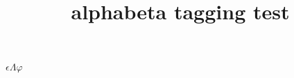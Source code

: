 \documentclass{article}
\title{alphabeta tagging test}
\begin{document}
$\epsilon\Lambda\varphi$

\Alpha\par
\Beta\par
\Gamma\par
\Delta\par
\Epsilon\par
\Zeta\par
\Eta\par
\Theta\par
\Iota\par
\Kappa\par
\Lambda\par
\Mu\par
\Nu\par
\Xi\par
\Omicron\par
\Pi\par
\Rho\par
\Sigma\par
\Tau\par
\Upsilon\par
\Phi\par
\Chi\par
\Psi\par
\Omega\par
\alpha\par
\beta\par
\gamma\par
\delta\par
\epsilon\par
\zeta\par
\eta\par
\theta\par
\iota\par
\kappa\par
\lambda\par
\mu\par
\nu\par
\xi\par
\omicron\par
\pi\par
\rho\par
\sigma\par
\varsigma\par
\finalsigma\par
\tau\par
\upsilon\par
\phi\par
\chi\par
\psi\par
\omega\par
\digamma\par
\Digamma\par
\stigma\par
\varstigma\par
\koppa\par
\Koppa\par
\qoppa\par
\Qoppa\par
\Stigma\par
\Sampi\par
\sampi\par
\varepsilon\par
\varphi\par
\varbeta\par
\varkappa\par
\varpi\par
\varrho\par
\varTheta\par
\vartheta\par
\end{document}
